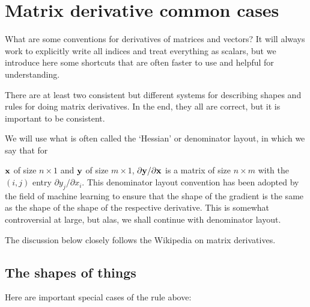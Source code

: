 \chapter{Matrix derivative common cases}
\label{app:matrix_deriv}

What are some conventions for derivatives of matrices and vectors?  It
will always work to explicitly write all indices and treat everything
as scalars, but we introduce here some shortcuts that are often faster
to use and helpful for understanding.

There are at least two consistent but different systems for describing
shapes and rules for doing matrix derivatives.  In the end, they all
are correct, but it is important to be consistent.

\newcommand{\av}{{\bf a}}
\newcommand{\xv}{{\bf x}}
\newcommand{\yv}{{\bf y}}
\newcommand{\uv}{{\bf u}}
\newcommand{\vv}{{\bf v}}
\newcommand{\fv}{{\bf f}}
\newcommand{\gv}{{\bf g}}
\newcommand{\am}{{\bf A}}
\newcommand{\xm}{{\bf X}}
\newcommand{\ym}{{\bf Y}}

We will use what is often called the `Hessian' or denominator layout,
in which we say that
for

$\xv$ of size $n\times 1$ and $\yv$ of size $m\times 1$,
$\partial \yv/\partial \xv$ is a matrix of size $n\times m$ with the
$(i, j)$ entry $\partial y_j/\partial x_i$.
This denominator layout convention has been adopted by the field of machine
learning to ensure that the shape of the gradient is the same as the shape
of the shape of the respective derivative. This is somewhat controversial at large,
but alas, we shall continue with denominator layout.

The discussion
below closely follows the Wikipedia on matrix derivatives.

\section{The shapes of things}
Here are important special cases of the rule above:


